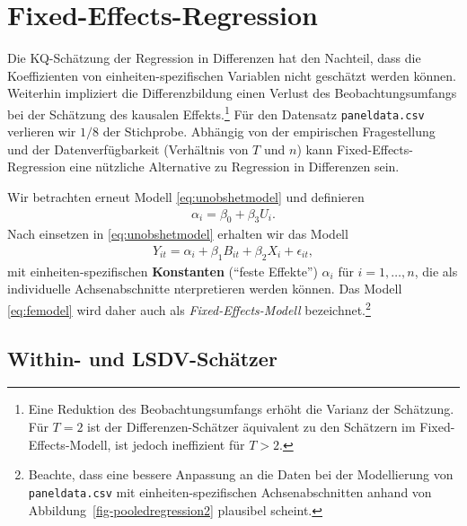 \documentclass[
  a4paper,
  DIV=11,
  oneside]{scrreprt}
\begin{document}
\section{Fixed-Effects-Regression}\label{fixed-effects-regression}

Die KQ-Schätzung der Regression in Differenzen hat den Nachteil, dass
die Koeffizienten von einheiten-spezifischen Variablen nicht geschätzt
werden können. Weiterhin impliziert die Differenzbildung einen Verlust
des Beobachtungsumfangs bei der Schätzung des kausalen
Effekts.\footnote{Eine Reduktion des Beobachtungsumfangs erhöht die
  Varianz der Schätzung. Für \(T=2\) ist der Differenzen-Schätzer
  äquivalent zu den Schätzern im Fixed-Effects-Modell, ist jedoch
  ineffizient für \(T>2\).} Für den Datensatz \texttt{paneldata.csv}
verlieren wir \(1/8\) der Stichprobe. Abhängig von der empirischen
Fragestellung und der Datenverfügbarkeit (Verhältnis von \(T\) und
\(n\)) kann Fixed-Effects-Regression eine nützliche Alternative zu
Regression in Differenzen sein.

Wir betrachten erneut Modell \eqref{eq:unobshetmodel} und definieren
\begin{align*}
  \alpha_i = \beta_0 + \beta_3 U_i.
\end{align*} Nach einsetzen in \eqref{eq:unobshetmodel} erhalten wir das
Modell \begin{align}
  Y_{it} = \alpha_i + \beta_1 B_{it} + \beta_2 X_i + \epsilon_{it} \label{eq:femodel},
\end{align} mit einheiten-spezifischen \textbf{Konstanten} (``feste
Effekte'') \(\alpha_i\) für \(i=1,\dots,n\), die als individuelle
Achsenabschnitte nterpretieren werden können. Das Modell
\eqref{eq:femodel} wird daher auch als \emph{Fixed-Effects-Modell}
bezeichnet.\footnote{Beachte, dass eine bessere Anpassung an die Daten
  bei der Modellierung von \texttt{paneldata.csv} mit
  einheiten-spezifischen Achsenabschnitten anhand von
  Abbildung~\ref{fig-pooledregression2} plausibel scheint.}

\subsection{Within- und LSDV-Schätzer}\label{sec-withldsv}
\end{document}

